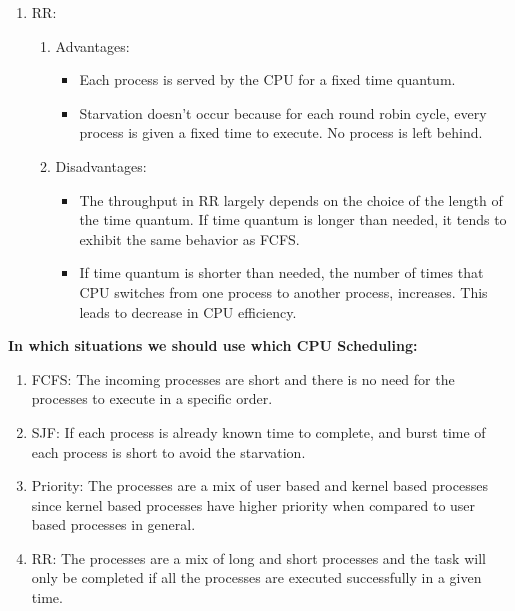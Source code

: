 \documentclass[a4paper]{article}
\newcommand{\tf}{\textbf}
\begin{document}
\begin{enumerate}[label = \alph*]
\begin{enumerate}
        \item RR:
        \begin{enumerate}
            \item Advantages:
            \begin{itemize}
                \item Each process is served by the CPU for a fixed time quantum.
                \item Starvation doesn't occur because for each round robin cycle, every process is given a fixed time to execute. No process is left behind.
            \end{itemize}

            \item Disadvantages:
            \begin{itemize}
                \item The throughput in RR largely depends on the choice of the length of the time quantum. If time quantum is longer than needed, it tends to exhibit the same behavior as FCFS.
                \item If time quantum is shorter than needed, the number of times that CPU switches from one process to another process, increases. This leads to decrease in CPU efficiency.
            \end{itemize}
        \end{enumerate}
    \end{enumerate}
    
    \tf{In which situations we should use which CPU Scheduling:} \\
    \begin{enumerate}
        \item FCFS: The incoming processes are short and there is no need for the processes to execute in a specific order.
        \item SJF: If each process is already known time to complete, and burst time of each process is short to avoid the starvation.
        \item Priority: The processes are a mix of user based and kernel based processes since kernel based processes have higher priority when compared to user based processes in general.
        \item RR: The processes are a mix of long and short processes and the task will only be completed if all the processes are executed successfully in a given time. 
    \end{enumerate}
\end{enumerate}
\end{document}
